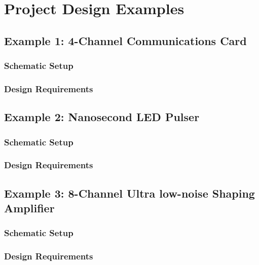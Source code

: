 
\chapter{Project Design Examples}
\label{ch:examples}

\section{Example 1: 4-Channel Communications Card}
\subsection{Schematic Setup}
\subsection{Design Requirements}
\section{Example 2: Nanosecond LED Pulser}
\subsection{Schematic Setup}
\subsection{Design Requirements}
\section{Example 3: 8-Channel Ultra low-noise Shaping Amplifier}
\subsection{Schematic Setup}
\subsection{Design Requirements}
